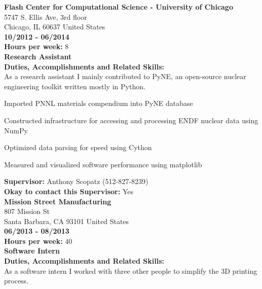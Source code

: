 \noindent\textbf{Flash Center for Computational Science - University of Chicago}\\
5747 S. Ellis Ave, 3rd floor\\
Chicago, IL   60637 United States\\
\textbf{10/2012 - 06/2014}\\
\textbf{Hours per week:} 8\\
\textbf{Research Assistant}\\
\textbf{Duties, Accomplishments and Related Skills:}\\
As a research assistant I mainly contributed to PyNE, an open-source nuclear
engineering toolkit written mostly in Python.
\begin{tightlist}

\item Imported PNNL materials compendium into PyNE database

\item Constructed infrastructure for accessing and processing ENDF nuclear data using NumPy

\item Optimized data parsing for speed using Cython

\item Measured and visualized software performance using matplotlib

\end{tightlist}
\textbf{Supervisor:} Anthony Scopatz (512-827-8239)\\
\textbf{Okay to contact this Supervisor:} Yes\\

\noindent\textbf{Mission Street Manufacturing}\\
807 Mission St\\
Santa Barbara, CA   93101 United States\\
\textbf{06/2013 - 08/2013}\\
\textbf{Hours per week:} 40\\
\textbf{Software Intern}\\
\textbf{Duties, Accomplishments and Related Skills:}\\
As a software intern I worked with three other people to simplify the 3D printing process.

